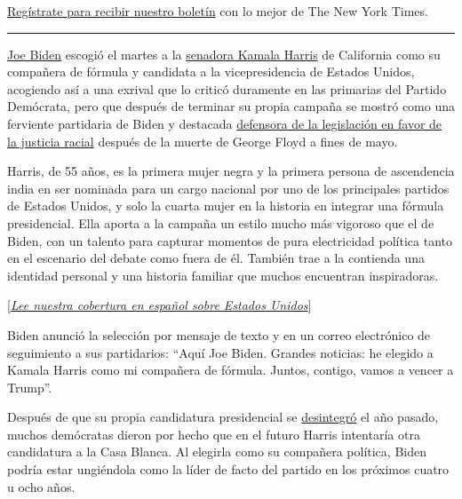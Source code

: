 \href{https://www.nytimes3xbfgragh.onion/newsletters/el-times}{Regístrate
para recibir nuestro boletín} con lo mejor de The New York Times.

\begin{center}\rule{0.5\linewidth}{\linethickness}\end{center}

\href{https://www.nytimes3xbfgragh.onion/es/interactive/2020/espanol/estados-unidos/joe-biden-elecciones.html}{Joe
Biden} escogió el martes a la
\href{https://www.nytimes3xbfgragh.onion/interactive/2020/us/elections/kamala-harris.html}{senadora
Kamala Harris} de California como su compañera de fórmula y candidata a
la vicepresidencia de Estados Unidos, acogiendo así a una exrival que lo
criticó duramente en las primarias del Partido Demócrata, pero que
después de terminar su propia campaña se mostró como una ferviente
partidaria de Biden y destacada
\href{https://www.nytimes3xbfgragh.onion/2020/06/10/us/politics/kamala-harris-racism-police.html}{defensora
de la legislación en favor de la justicia racial} después de la muerte
de George Floyd a fines de mayo.

Harris, de 55 años, es la primera mujer negra y la primera persona de
ascendencia india en ser nominada para un cargo nacional por uno de los
principales partidos de Estados Unidos, y solo la cuarta mujer en la
historia en integrar una fórmula presidencial. Ella aporta a la campaña
un estilo mucho más vigoroso que el de Biden, con un talento para
capturar momentos de pura electricidad política tanto en el escenario
del debate como fuera de él. También trae a la contienda una identidad
personal y una historia familiar que muchos encuentran inspiradoras.

\href{https://www.nytimes3xbfgragh.onion/es/section/estados-unidos}{{[}}\href{https://www.nytimes3xbfgragh.onion/es/section/estados-unidos}{\emph{Lee
nuestra cobertura en español sobre Estados Unidos}}{]}

Biden anunció la selección por mensaje de texto y en un correo
electrónico de seguimiento a sus partidarios: ``Aquí Joe Biden. Grandes
noticias: he elegido a Kamala Harris como mi compañera de fórmula.
Juntos, contigo, vamos a vencer a Trump''.

Después de que su propia candidatura presidencial se
\href{https://www.nytimes3xbfgragh.onion/2019/11/29/us/politics/kamala-harris-2020.html}{desintegró}
el año pasado, muchos demócratas dieron por hecho que en el futuro
Harris intentaría otra candidatura a la Casa Blanca. Al elegirla como su
compañera política, Biden podría estar ungiéndola como la líder de facto
del partido en los próximos cuatro u ocho años.

